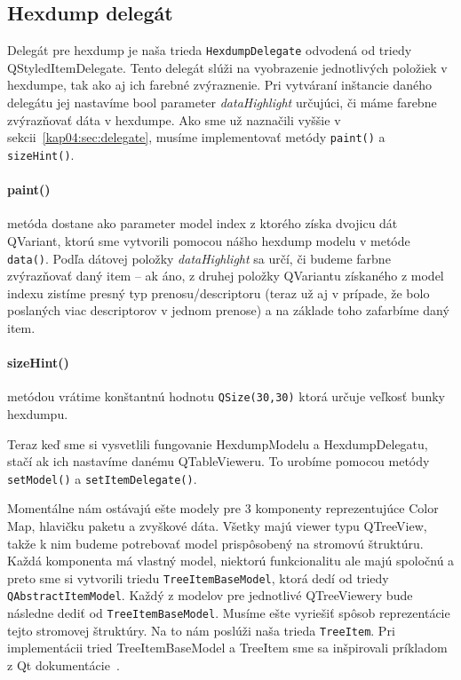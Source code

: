 \subsection{Hexdump delegát}
Delegát pre hexdump je naša trieda \texttt{HexdumpDelegate} odvodená od triedy QStyledItemDelegate. Tento delegát slúži na vyobrazenie jednotlivých položiek v hexdumpe, tak ako aj ich farebné zvýraznenie. Pri vytváraní inštancie daného delegátu jej nastavíme bool parameter \textit{dataHighlight} určujúci, či máme farebne zvýrazňovať dáta v hexdumpe. Ako sme už naznačili vyššie v sekcii~\ref{kap04:sec:delegate}, musíme implementovať metódy \texttt{paint()} a \texttt{sizeHint()}.

\paragraph{paint()} metóda dostane ako parameter model index z ktorého získa dvojicu dát QVariant, ktorú sme vytvorili pomocou nášho hexdump modelu v metóde \texttt{data()}. Podľa dátovej položky \textit{dataHighlight} sa určí, či budeme farbne zvýrazňovať daný item -- ak áno, z druhej položky QVariantu získaného z model indexu zistíme presný typ prenosu/descriptoru (teraz už aj v prípade, že bolo poslaných viac descriptorov v jednom prenose) a na základe toho zafarbíme daný item.

\paragraph{sizeHint()} metódou vrátime konštantnú hodnotu \texttt{QSize(30,30)} ktorá určuje veľkosť bunky hexdumpu.


Teraz keď sme si vysvetlili fungovanie HexdumpModelu a HexdumpDelegatu, stačí ak ich nastavíme danému QTableVieweru. To urobíme pomocou metódy \texttt{setModel()} a \texttt{setItemDelegate()}.

Momentálne nám ostávajú ešte modely pre 3 komponenty reprezentujúce Color Map, hlavičku paketu a zvyškové dáta. Všetky majú viewer typu QTreeView, takže k nim budeme potrebovať model prispôsobený na stromovú štruktúru. Každá komponenta má vlastný model, niektorú funkcionalitu ale majú spoločnú a preto sme si vytvorili triedu \texttt{TreeItemBaseModel}, ktorá dedí od triedy \texttt{QAbstractItemModel}. Každý z modelov pre jednotlivé QTreeViewery bude následne dediť od \texttt{TreeItemBaseModel}. Musíme ešte vyriešiť spôsob reprezentácie tejto stromovej štruktúry. Na to nám poslúži naša trieda \texttt{TreeItem}. Pri implementácii tried TreeItemBaseModel a TreeItem sme sa inšpirovali príkladom z Qt dokumentácie~\cite{qtreemodelexample}.

